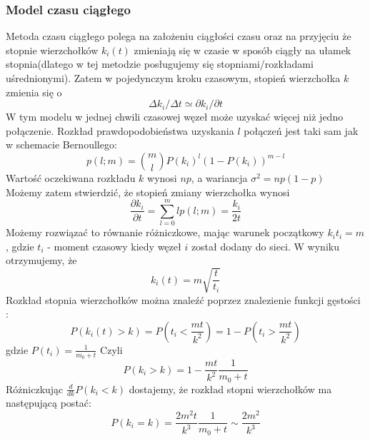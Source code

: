 \documentclass{article}
\begin{document}
\subsubsection{Model czasu ciągłego}
	Metoda czasu ciągłego polega na założeniu ciągłości czasu oraz na przyjęciu że stopnie wierzchołków $k_i(t)$ zmieniają się w czasie w sposób ciągły na ułamek stopnia(dlatego w tej metodzie posługujemy się stopniami/rozkładami uśrednionymi).
	Zatem w pojedynczym kroku czasowym, stopień wierzchołka $k$ zmienia się o
	\begin{equation}
	\Delta k_i/\Delta t \simeq \partial k_i / \partial t
	\end{equation}
		W tym modelu w jednej chwili czasowej węzeł może uzyskać więcej niż jedno połączenie. Rozkład prawdopodobieństwa uzyskania $l$ połączeń jest taki sam jak w schemacie Bernoullego:
		\begin{equation}
		p(l;m) = \binom{m}{l}P(k_i)^l(1 - P(k_i))^{m -l}
		\end{equation}
	Wartość oczekiwana rozkładu $k$ wynosi $np$, a wariancja $\sigma^2 = np(1 - p)$\\ Możemy zatem stwierdzić, że stopień zmiany wierzchołka wynosi
	\begin{equation}
		\frac{\partial k_i}{\partial t} = \sum_{l = 0}^m lp(l; m) = \frac{k_i} {2t}
	\end{equation}
	Możemy rozwiązać to równanie różniczkowe, mając warunek początkowy $k_i{t_i} = m$, gdzie $t_i$ - moment czasowy kiedy węzeł $i$ został dodany do sieci. W wyniku otrzymujemy, że 
	\begin{equation}
		k_i(t) = m \sqrt{\frac{t}{t_i}}
	\end{equation}
	Rozkład stopnia wierzchołków można znaleźć poprzez znalezienie funkcji gęstości :
	\begin{equation}
		P(k_i(t) > k) = P(t_i < \frac{mt}{k^2}) = 1 - P(t_i > \frac{mt}{k^2})
	\end{equation}
	gdzie $P(t_i) = \frac{1}{m_0 + t}$ Czyli 
	\begin{equation}
		P(k_i > k) = 1 - \frac{mt}{k^2}\frac{1}{m_0 + t}
	\end{equation}
	Różniczkując $\frac{d}{dk}P(k_i < k)$ dostajemy, że rozkład stopni wierzchołków ma następującą postać:
	\begin{equation}
	P(k_i = k) = \frac{2m^2t}{k^3}\frac{1}{m_0 + t} \sim \frac{2m^2}{k^3}
	\end{equation}
\end{document}
